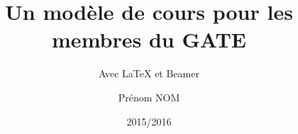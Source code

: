 \title{Un modèle de cours pour les membres du GATE}
\subtitle{Avec \LaTeX{} et Beamer}
\author{Prénom NOM}
\date{2015/2016}
